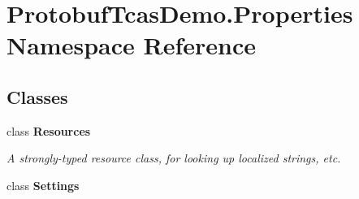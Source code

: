 \hypertarget{namespace_protobuf_tcas_demo_1_1_properties}{}\section{Protobuf\+Tcas\+Demo.\+Properties Namespace Reference}
\label{namespace_protobuf_tcas_demo_1_1_properties}
\subsection*{Classes}
\begin{DoxyCompactItemize}
\item 
class {\bfseries Resources}
\begin{DoxyCompactList}\small\item\em A strongly-\/typed resource class, for looking up localized strings, etc. \end{DoxyCompactList}\item 
class {\bfseries Settings}
\end{DoxyCompactItemize}
